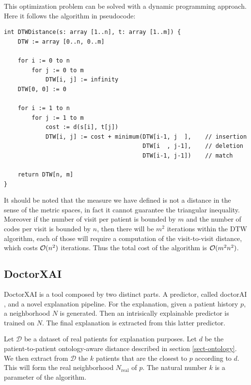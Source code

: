 \documentclass[]{marticle}
\newcommand{\ds}{\mathcal{D}}
\begin{document}
This optimization problem can be solved with a dynamic programming approach. Here it follows the
algorithm in pseudocode:
\begin{verbatim}
int DTWDistance(s: array [1..n], t: array [1..m]) {
    DTW := array [0..n, 0..m]
    
    for i := 0 to n
        for j := 0 to m
            DTW[i, j] := infinity
    DTW[0, 0] := 0
    
    for i := 1 to n
        for j := 1 to m
            cost := d(s[i], t[j])
            DTW[i, j] := cost + minimum(DTW[i-1, j  ],    // insertion
                                        DTW[i  , j-1],    // deletion
                                        DTW[i-1, j-1])    // match
    
    return DTW[n, m]
}
\end{verbatim}

It should be noted that the measure we have defined is not a distance in the sense of the metric
spaces, in fact it cannot guarantee the triangular inequality. Moreover if the number of visit per
patient is bounded by $m$ and the number of codes per visit is bounded by $n$, then there will be
$m^2$ iterations within the DTW algorithm, each of those will require a computation of the
visit-to-visit distance, which costs $\mathcal{O}(n^2)$ iterations. Thus the total cost of the
algorithm is $\mathcal{O}(m^2n^2)$.

\subsection{DoctorXAI} \label{sect-drxai}

DoctorXAI \cite{panigutti-xai} is a tool composed by two distinct parts. A predictor, called
doctorAI \cite{paper-doctor-ai}, and a novel explanation pipeline.  For the explanation, given a patient history $p$, a neighborhood $N$ is generated. Then an
intrisically explainable predictor is trained on $N$. The final explanation is extracted from this
latter predictor.

\newcommand{\realds}{N_\text{real}}

Let $\ds$ be a dataset of real patients for explanation purposes. Let $d$ be the patient-to-patient
ontology-aware distance described in section \ref{sect-ontology}. We then extract from $\ds$ the $k$
patients that are the closest to $p$ according to $d$. This will form the real neighborhood
$\realds$ of $p$. The natural number $k$ is a parameter of the algorithm.
\end{document}
